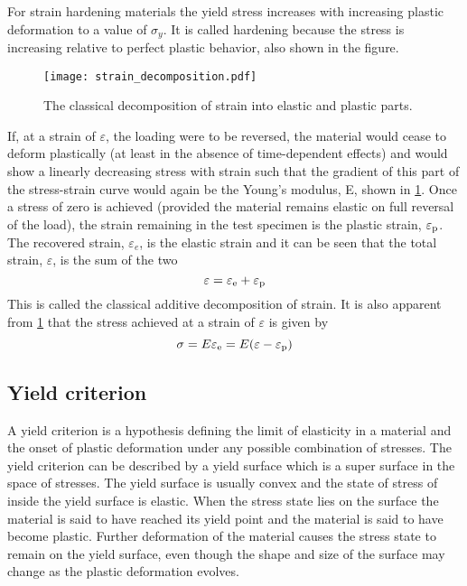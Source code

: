 For strain hardening materials the yield stress increases with increasing plastic deformation to a value of $\sigma_y$.
It is called hardening because the stress is increasing relative to perfect plastic behavior, also shown in the figure.
\begin{figure}[ht]
	\centering
	\texttt{[image: strain\_decomposition.pdf]}
	\caption{The classical decomposition of strain into elastic and plastic parts.}
	\label{Fig:strain_decomposition}
\end{figure}
If, at a strain of $\varepsilon$, the loading were to be reversed, the material would cease to deform plastically (at least in the absence of time-dependent effects) and would show a linearly decreasing stress with strain such that the gradient of this part of the stress-strain curve would again be the Young's modulus, E, shown in \ref{Fig:strain_decomposition}.
Once a stress of zero is achieved (provided the material remains elastic on full reversal of the load), the strain remaining in the test specimen is the plastic strain, $\varepsilon_{\rm{p}}$.
The recovered strain, $\varepsilon_e$, is the elastic strain and it can be seen that the total strain, $\varepsilon$, is the sum of the two
\begin{equation}
\varepsilon = \varepsilon_{\rm{e}} + \varepsilon_{\rm{p}}
\end{equation}
This is called the classical additive decomposition of strain.
It is also apparent from \ref{Fig:strain_decomposition} that the stress achieved at a strain of $\varepsilon$ is given by
\begin{equation}
\sigma = E\varepsilon_{\rm{e}} = E(\varepsilon - \varepsilon_{\rm{p}})
\end{equation}

\subsection{Yield criterion}
\noindent
A yield criterion is a hypothesis defining the limit of elasticity in a material and the onset of plastic deformation under any possible combination of stresses.
The yield criterion can be described by a yield surface which is a super surface in the space of stresses.
The yield surface is usually convex and the state of stress of inside the yield surface is elastic.
When the stress state lies on the surface the material is said to have reached its yield point and the material is said to have become plastic.
Further deformation of the material causes the stress state to remain on the yield surface, even though the shape and size of the surface may change as the plastic deformation evolves.

